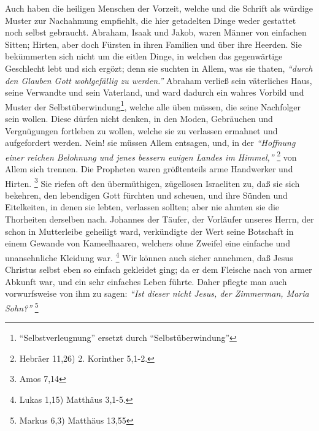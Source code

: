 Auch haben die heiligen Menschen der Vorzeit, welche und die Schrift als würdige
Muster zur Nachahmung empfiehlt, die hier getadelten Dinge weder gestattet noch
selbst gebraucht. Abraham, Isaak und Jakob, waren Männer von einfachen Sitten;
Hirten, aber doch Fürsten in ihren Familien und über ihre Heerden. Sie
bekümmerten sich nicht um die eitlen Dinge, in welchen das gegenwärtige
Geschlecht lebt und sich ergözt; denn sie suchten in Allem, was sie thaten,
\textit{"`durch den Glauben Gott wohlgefällig zu werden."'} Abraham verließ sein
väterliches Haus, seine Verwandte und sein Vaterland, und ward dadurch ein
wahres Vorbild und Muster der Selbstüberwindung\footnote{"`Selbstverleugnung"' ersetzt durch "`Selbstüberwindung"'}, welche alle üben müssen, die
seine Nachfolger sein wollen. Diese dürfen nicht denken, in den Moden,
Gebräuchen und Vergnügungen fortleben zu wollen, welche sie zu verlassen
ermahnet und aufgefordert werden. Nein! sie müssen Allem entsagen, und, in der
\textit{"`Hoffnung einer reichen Belohnung und jenes bessern ewigen Landes im
Himmel,"'}
\footnote{Hebräer 11,26) 2. Korinther 5,1-2.} 
von Allem sich trennen. Die
Propheten waren größtenteils arme Handwerker und Hirten.
\footnote{Amos 7,14} 
Sie riefen oft den übermüthigen, zügellosen Israeliten zu, daß sie sich bekehren,
den lebendigen Gott fürchten und scheuen, und ihre Sünden und Eitelkeiten, in
denen sie lebten, verlassen sollten; aber nie ahmten sie die Thorheiten
derselben nach. Johannes der Täufer, der Vorläufer unseres Herrn, der schon in
Mutterleibe geheiligt ward, verkündigte der Wert seine Botschaft in einem
Gewande von Kameelhaaren, welchers ohne Zweifel eine einfache und unansehnliche
Kleidung war.
\footnote{Lukas 1,15) Matthäus 3,1-5.} 
Wir können auch sicher annehmen,
daß Jesus Christus selbst eben so einfach gekleidet ging; da er dem Fleische
nach von armer Abkunft war, und ein sehr einfaches Leben führte. Daher pflegte
man auch vorwurfsweise von ihm zu sagen: 
\textit{"`Ist dieser nicht Jesus, der
Zimmerman, Maria Sohn?"'}
\footnote{Markus 6,3) Matthäus 13,55} 
